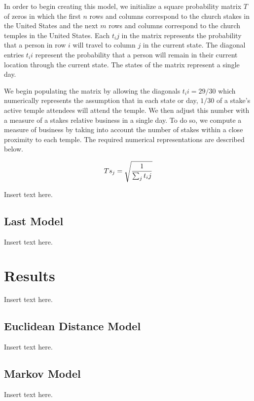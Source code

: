 \documentclass[twoside,twocolumn]{article}
\begin{document}
In order to begin creating this model, we initialize a square probability matrix $T$ of zeros in which the first $n$ rows and columns correspond to the church stakes in the United States and the next $m$ rows and columns correspond to the church temples in the United States. Each $t_ij$ in the matrix represents the probability that a person in row $i$ will travel to column $j$ in the current state. The diagonal entries $t_ii$ represent the probability that a person will remain in their current location through the current state. The states of the matrix represent a single day.

We begin populating the matrix by allowing the diagonals $t_ii = 29/30$ which numerically represents the assumption that in each state or day, $1/30$ of a stake's active temple attendees will attend the temple. We then adjust this number with a measure of a stakes relative business in a single day. To do so, we compute a measure of business by taking into account the number of stakes within a close proximity to each temple. The required numerical representations are described below.

\begin{equation}
\begin{aligned}
Ts_j = \sqrt{1\over{\sum_j{t_ij}}}
\end{aligned}
\end{equation}


Insert text here.
\subsection{Last Model} %
Insert text here.

\section{Results}
\label{sec:res}
Insert text here.
\subsection{Euclidean Distance Model}
Insert text here.
\subsection{Markov Model}
Insert text here.
\end{document}
